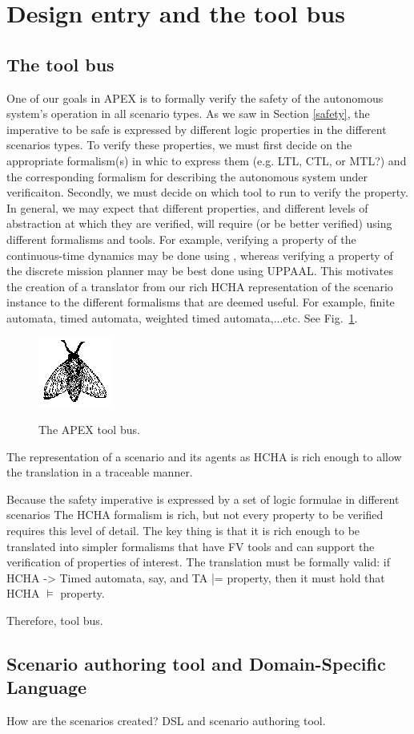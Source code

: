 \section{Design entry and the tool bus}
\label{designEntryAndToolBus}

\subsection{The tool bus}
\label{tool bus}
One of our goals in APEX is to formally verify the safety of the autonomous system's operation in all scenario types.
As we saw in Section \ref{safety}, the imperative to be safe is expressed by different logic properties in the different scenarios types.
To verify these properties, we must first decide on the appropriate formalism(s) in whic to express them (e.g. LTL, CTL, or MTL?) 
and the corresponding formalism for describing the autonomous system under verificaiton.
Secondly, we must decide on which tool to run to verify the property.
In general, we may expect that different properties, and different levels of abstraction at which they are verified, will require (or be better verified) using different formalisms and tools. 
For example, verifying a property of the continuous-time dynamics may be done using {\staliro},
whereas verifying a property of the discrete mission planner may be best done using UPPAAL.
This motivates the creation of a translator from our rich HCHA representation of the scenario instance to the different formalisms that are deemed useful. 
For example, finite automata, timed automata, weighted timed automata,...etc.
See Fig.~\ref{fig:toolbus}.

\begin{figure}[tb]
	\centering
		\includegraphics{figures/fly.eps}
	\label{fig:toolbus}
	\caption{The APEX tool bus.}
\end{figure}


The representation of a scenario and its agents as HCHA is rich enough to allow the translation in a traceable manner.

Because the safety imperative is expressed by a set of logic formulae in different scenarios
The HCHA formalism is rich, but not every property to be verified requires this level of detail.
The key thing is that it is rich enough to be translated into simpler formalisms that have FV tools and can support the verification of properties of interest.
The translation must be formally valid: if HCHA -> Timed automata, say, and TA |= property, then it must hold that HCHA $\models$ property.

Therefore, tool bus.



\subsection{Scenario authoring tool and Domain-Specific Language}
\label{dsl}
How are the scenarios created? DSL and scenario authoring tool.